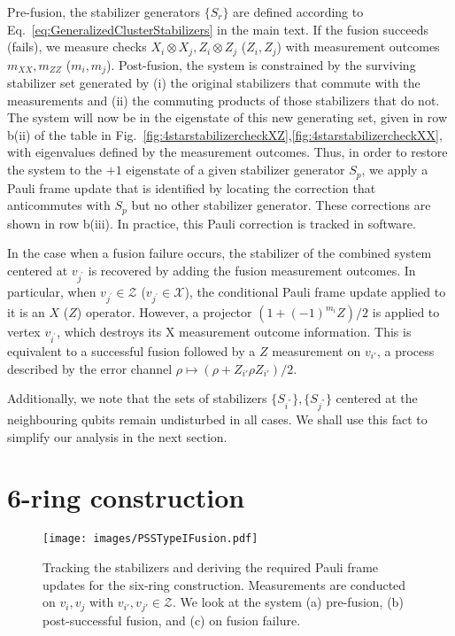 \documentclass[reprint,
groupedaddress,
 prl,amsmath,amssymb,
 aps]{revtex4-2}
\theoremstyle{definition}
\begin{document}
\begin{bibunit}
Pre-fusion, the stabilizer generators $\{S_r\}$ are defined according to Eq.~\eqref{eq:GeneralizedClusterStabilizers} in the main text.  If the fusion succeeds (fails), we measure checks $X_i \otimes X_j, Z_i\otimes  Z_j$ ($Z_i , Z_j$) with measurement outcomes $m_{XX}, m_{ZZ} $ ($m_i, m_j$). Post-fusion, the system is constrained by the surviving stabilizer set generated by (i) the original stabilizers that commute with the measurements and (ii) the commuting products of those stabilizers that do not. The system will now be in the eigenstate of this new generating set, given in row b(ii) of the table in Fig.~\ref{fig:4starstabilizercheckXZ},\ref{fig:4starstabilizercheckXX}, with eigenvalues defined by the measurement outcomes. Thus, in order to restore the system to the $+1$ eigenstate of  a given stabilizer generator $S_p$, we apply a Pauli frame update that is identified by locating the correction that anticommutes with $S_p$ but no other stabilizer generator. These corrections are shown in row b(iii). In practice, this Pauli correction is tracked in software. 

In the case when a fusion failure occurs, the stabilizer of the combined system centered at $v_{j^{\prime}}$ is recovered by adding the fusion measurement outcomes. In particular, when $v_{j^\prime} \in \mathcal{Z}$ ($v_{j^\prime} \in \mathcal{X}$), the conditional Pauli frame update applied to it is an $X$ ($Z$) operator. However, a projector $(1 + (-1)^{m_i} Z) / 2$ is applied to vertex $v_{i^{\prime}}$, which destroys its X measurement outcome information. This is equivalent to a successful fusion followed by a $Z$ measurement on $v_{i'}$, a process described by the error channel ${\rho\mapsto}(\rho+Z_{i'}\rho Z_{i'})/2$.


Additionally, we note that the sets of stabilizers $\{S_{i^{''}} \}, \{S_{j^{''}} \}$ centered at the neighbouring qubits remain undisturbed in all cases. We shall use this fact to simplify our analysis in the next section.

\section{6-ring construction} 
\begin{figure}[ht]
    \centering
\texttt{[image: images/PSSTypeIFusion.pdf]}
    \caption{Tracking the stabilizers and deriving the required Pauli frame updates for the six-ring construction. Measurements are conducted on $v_i,v_j$ with $v_{i'},v_{j'}\in\mathcal{Z}$. We look at the system (a) pre-fusion, (b) post-successful fusion, and (c) on fusion failure.}
    \label{fig:6ringstabzz}
\end{figure}


\end{bibunit}
\end{document}
